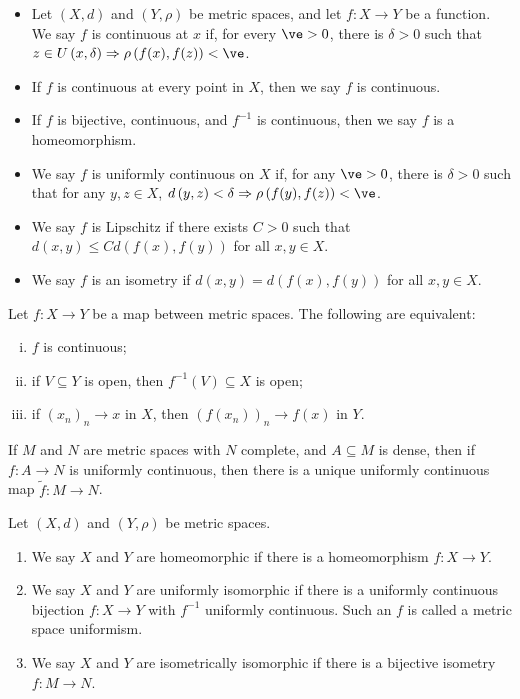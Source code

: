 \begin{definition}[Continuity]
  \begin{itemize}
    \item Let $\left(X,d\right)$ and $\left(Y,\rho\right)$ be metric spaces, and let $f\colon X\rightarrow Y$ be a function. We say $f$ is continuous at $x$ if, for every $\ve > 0$, there is $\delta > 0$ such that $z\in U\left(x,\delta\right)\Rightarrow \rho\left(f(x),f(z)\right) < \ve$.
    \item If $f$ is continuous at every point in $X$, then we say $f$ is continuous.
    \item If $f$ is bijective, continuous, and $f^{-1}$ is continuous, then we say $f$ is a homeomorphism.
    \item We say $f$ is uniformly continuous on $X$ if, for any $\ve > 0$, there is $\delta > 0$ such that for any $y,z\in X$, $d\left(y,z\right) < \delta \Rightarrow \rho\left(f(y),f(z)\right) < \ve$.
    \item We say $f$ is Lipschitz if there exists $C > 0$ such that $d\left(x,y\right) \leq Cd\left(f(x),f(y)\right)$ for all $x,y\in X$.
    \item We say $f$ is an isometry if $d\left(x,y\right) = d\left(f(x),f(y)\right)$ for all $x,y\in X$.
  \end{itemize}
\end{definition}
\begin{fact}
  Let $f\colon X\rightarrow Y$ be a map between metric spaces. The following are equivalent:
  \begin{enumerate}[(i)]
    \item $f$ is continuous;
    \item if $V\subseteq Y$ is open, then $f^{-1}\left(V\right)\subseteq X$ is open;
    \item if $\left(x_n\right)_n\rightarrow x$ in $X$, then $\left(f\left(x_n\right)\right)_n\rightarrow f(x)$ in $Y$.
  \end{enumerate}
\end{fact}
\begin{fact}
  If $M$ and $N$ are metric spaces with $N$ complete, and $A\subseteq M$ is dense, then if $f\colon A\rightarrow N$ is uniformly continuous, then there is a unique uniformly continuous map $\tilde{f}\colon M\rightarrow N$.
\end{fact}
\begin{definition}
  Let $\left(X,d\right)$ and $\left(Y,\rho\right)$ be metric spaces.
  \begin{enumerate}[(1)]
    \item We say $X$ and $Y$ are homeomorphic if there is a homeomorphism $f\colon X\rightarrow Y$.
    \item We say $X$ and $Y$ are uniformly isomorphic if there is a uniformly continuous bijection $f\colon X\rightarrow Y$ with $f^{-1}$ uniformly continuous. Such an $f$ is called a metric space uniformism.
    \item We say $X$ and $Y$ are isometrically isomorphic if there is a bijective isometry $f\colon M\rightarrow N$.
  \end{enumerate}
\end{definition}
